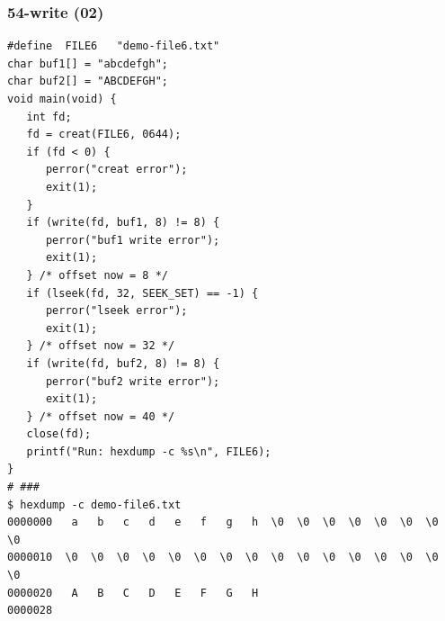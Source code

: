 \documentclass[aspectratio=169, xcolor=table, notheorems, hyperref={pdfpagelabels=false}]{beamer}
\begin{document}
\begin{frame}[fragile]
\frametitle{54-write (02)}
\begin{lstlisting}[basicstyle=\ttfamily\tiny]
#define  FILE6   "demo-file6.txt"
char buf1[] = "abcdefgh";
char buf2[] = "ABCDEFGH";
void main(void) {
   int fd;
   fd = creat(FILE6, 0644);
   if (fd < 0) {
      perror("creat error");
      exit(1);
   }
   if (write(fd, buf1, 8) != 8) {
      perror("buf1 write error");
      exit(1);
   } /* offset now = 8 */
   if (lseek(fd, 32, SEEK_SET) == -1) {
      perror("lseek error");
      exit(1);
   } /* offset now = 32 */
   if (write(fd, buf2, 8) != 8) {
      perror("buf2 write error");
      exit(1);
   } /* offset now = 40 */
   close(fd);
   printf("Run: hexdump -c %s\n", FILE6);
}
# ###
$ hexdump -c demo-file6.txt 
0000000   a   b   c   d   e   f   g   h  \0  \0  \0  \0  \0  \0  \0  \0
0000010  \0  \0  \0  \0  \0  \0  \0  \0  \0  \0  \0  \0  \0  \0  \0  \0
0000020   A   B   C   D   E   F   G   H                                
0000028
\end{lstlisting}
\end{frame}

\end{document}
